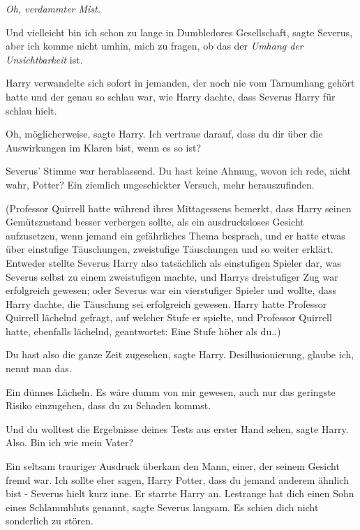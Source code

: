 \emph{Oh, verdammter Mist.}

\glqq{}Und vielleicht bin ich schon zu lange in Dumbledores Gesellschaft\grqq{},
sagte Severus, \glqq{}aber ich komme nicht umhin, mich zu fragen, ob das der
\emph{Umhang der Unsichtbarkeit} ist.\grqq{}

Harry verwandelte sich sofort in jemanden, der noch nie vom Tarnumhang gehört
hatte und der genau so schlau war, wie Harry dachte, dass Severus Harry für
schlau hielt.

\glqq{}Oh, möglicherweise\grqq{}, sagte Harry. \glqq{}Ich vertraue darauf, dass
du dir über die Auswirkungen im Klaren bist, wenn es so ist?\grqq{}

Severus' Stimme war herablassend. \glqq{}Du hast keine Ahnung, wovon ich rede,
nicht wahr, Potter? Ein ziemlich ungeschickter Versuch, mehr
herauszufinden.\grqq{}

(Professor Quirrell hatte während ihres Mittagessens bemerkt, dass Harry seinen
Gemütszustand besser verbergen sollte, als ein ausdrucksloses Gesicht
aufzusetzen, wenn jemand ein gefährliches Thema besprach, und er hatte etwas
über einstufige Täuschungen, zweistufige Täuschungen und so weiter erklärt.
Entweder stellte Severus Harry also tatsächlich als einstufigen Spieler dar, was
Severus selbst zu einem zweistufigen machte, und Harrys dreistufiger Zug war
erfolgreich gewesen; oder Severus war ein vierstufiger Spieler und wollte, dass
Harry dachte, die Täuschung sei erfolgreich gewesen. Harry hatte Professor
Quirrell lächelnd gefragt, auf welcher Stufe er spielte, und Professor Quirrell
hatte, ebenfalls lächelnd, geantwortet: \glqq{}Eine Stufe höher als du.\grqq{}.)

\glqq{}Du hast also die ganze Zeit zugesehen\grqq{}, sagte Harry. \glqq{}
Desillusionierung, glaube ich, nennt man das.\grqq{}

Ein dünnes Lächeln. \glqq{}Es wäre dumm von mir gewesen, auch nur das geringste
Risiko einzugehen, dass du zu Schaden kommst.\grqq{}

\glqq{}Und du wolltest die Ergebnisse deines Tests aus erster Hand sehen\grqq{},
sagte Harry. \glqq{}Also. Bin ich wie mein Vater?\grqq{}

Ein seltsam trauriger Ausdruck überkam den Mann, einer, der seinem Gesicht fremd
war. \glqq{}Ich sollte eher sagen, Harry Potter, dass du jemand anderem ähnlich
bist -\grqq{} Severus hielt kurz inne. Er starrte Harry an. \glqq{}Lestrange hat
dich einen Sohn eines Schlammbluts genannt\grqq{}, sagte Severus langsam.
\glqq{}Es schien dich nicht sonderlich zu stören.\grqq{}

